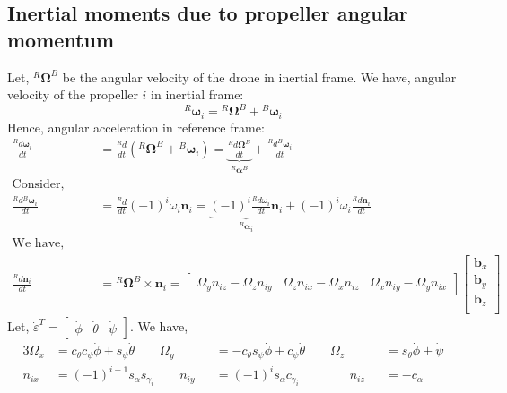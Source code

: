 \subsection{Inertial moments due to propeller angular momentum}
Let, ${}^R \pmb \Omega^B$ be the angular velocity of the drone in inertial frame. We have, angular velocity of the propeller $i$ in inertial frame:
$${}^R \pmb \omega_i = {}^R \pmb \Omega^B + {}^B \pmb \omega_i$$
Hence, angular acceleration in reference frame:
\begin{align*}
    \frac{{}^R d \pmb \omega_i}{dt} &= \frac{{}^R d}{dt}\left( {}^R \pmb \Omega^B + {}^B \pmb \omega_i \right)
    = \underbrace{\frac{{}^R d \pmb \Omega^B}{dt}}_{{}^R\pmb\alpha^B} + \frac{{}^R d{}^B \pmb \omega_i}{dt}\\
\text{Consider,} \qquad & \\
    \frac{{}^R d{}^B \pmb \omega_i}{dt} &= \frac{{}^R d}{dt} (-1)^{i} \omega_i \pmb n_i
    = \underbrace{(-1)^{i} \frac{{}^R d\omega_i }{dt} \pmb n_i}_{{}^B \pmb \alpha_i} +
    (-1)^{i} \omega_i \frac{{}^R d\pmb n_i}{dt} \\
\text{We have,} \qquad &\\
    \frac{{}^R d\pmb n_i}{dt} &= {}^R \pmb \Omega^B \times \pmb n_i
    = \begin{bmatrix}
        \Omega_y n_{iz} - \Omega_z n_{iy} &
        \Omega_z n_{ix} - \Omega_x n_{iz} &
        \Omega_x n_{iy} - \Omega_y n_{ix}
    \end{bmatrix}
    \begin{bmatrix}
    \pmb b_x \\ \pmb b_y \\ \pmb b_z\\
    \end{bmatrix}
\end{align*}
%
Let, $\dot \varepsilon^T  = \begin{bmatrix} \dot \phi & \dot \theta & \dot \psi \end{bmatrix}$. We have,
%
\begin{alignat*}{3}
        \Omega_x &=  c_{\theta}c_{\psi} \dot \phi + s_{\psi} \dot \theta \qquad
        \Omega_y &&= -c_{\theta}s_{\psi} \dot \phi + c_{\psi} \dot \theta \qquad
        \Omega_z &&= s_{\theta} \dot \phi + \dot \psi\\
        n_{ix}   &=  (-1)^{i+1} s_{\alpha} s_{\gamma_i} \qquad
        n_{iy}   &&= (-1)^{i} s_{\alpha} c_{\gamma_i}  \qquad \qquad
        n_{iz}   &&= -c_{\alpha}
\end{alignat*}
%

